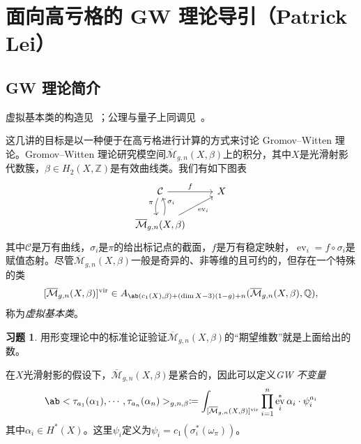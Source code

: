 \documentclass{amsart}
\theoremstyle{definition}
\newtheorem{exer}[thm]{习题}
\theoremstyle{remark}
\theoremstyle{plain}
\theoremstyle{definition}
\theoremstyle{remark}
\newcommand{\Z}{\mathbb{Z}}
\newcommand{\Q}{\mathbb{Q}}
\newcommand{\Mbar}{\overline{\mathcal{M}}}
\newcommand{\mc}[1]{\mathcal{#1}}
\newcommand{\mr}[1]{\mathrm{#1}}
\newcommand{\on}[1]{\operatorname{#1}}
\newcommand{\1}{\mathbf{1}}
\newcommand{\2}{\mathbf{2}}
\newcommand{\3}{\mathbf{3}}
\newcommand{\vir}{\mr{vir}}
\DeclareMathOperator{\ev}{ev}
\begin{document}
\section{面向高亏格的 GW 理论导引（Patrick Lei）}%
\label{sec:Intro to GW theory with a view to higher genus (Patrick Lei)}


\subsection{GW 理论简介}%
\label{sub:Introduction to GW theory}

虚拟基本类的构造见~\cite{BehrendFantechi1997}；公理与量子上同调见~\cite{KM1994}。

这几讲的目标是以一种便于在高亏格进行计算的方式来讨论 Gromov--Witten 理论。Gromov--Witten 理论研究模空间\(\Mbar_{g,n}(X, \beta)\)上的积分，其中\(X\)是光滑射影代数簇，\(\beta \in H_2(X, \Z)\)是有效曲线类。我们有如下图表
\begin{equation*}
\begin{tikzcd}
    \mc{C} \ar{r}{f} \ar[bend right=20]{d}[swap]{\pi} & X \\
    \Mbar_{g,n}(X, \beta) \ar[bend right=20]{u}[swap]{\sigma_i} \ar{ur}[swap]{\on{ev}_i}
\end{tikzcd}
\end{equation*}
其中\(\mc{C}\)是万有曲线，\(\sigma_i\)是\(\pi\)的给出标记点的截面，\(f\)是万有稳定映射，\(\ev_i = f \circ \sigma_i\)是赋值态射。尽管\(\Mbar_{g,n}(X, \beta)\)一般是奇异的、非等维的且可约的，但存在一个特殊的类
\[ [\Mbar_{g,n}(X, \beta)]^{\vir} \in A_{\ab(c_1(X), \beta) + (\dim X - 3)(1-g) + n}(\Mbar_{g,n}(X, \beta), \Q), \]
称为\textit{虚拟基本类}。

\begin{exer}
    用形变理论中的标准论证验证\(\Mbar_{g,n}(X, \beta)\)的“期望维数”就是上面给出的数。
\end{exer}

在\(X\)光滑射影的假设下，\(\Mbar_{g,n}(X, \beta)\)是紧合的，因此可以定义\textit{GW 不变量}
\[ \ab<\tau_{a_1}(\alpha_1), \cdots, \tau_{a_n}(\alpha_n)>_{g,n,\beta} \coloneqq \int_{[\Mbar_{g,n}(X, \beta)]^{\vir}} \prod_{i=1}^n \ev_i^* \alpha_i \cdot \psi_i^{a_i} \]
其中\(\alpha_i \in H^*(X)\)。这里\(\psi_i\)定义为\(\psi_i = c_1(\sigma_i^*(\omega_{\pi}))\)。
\end{document}
